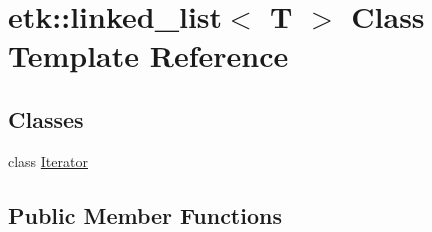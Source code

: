\hypertarget{classetk_1_1linked__list}{\section{etk\-:\-:linked\-\_\-list$<$ T $>$ Class Template Reference}
\label{classetk_1_1linked__list}
}
\subsection*{Classes}
\begin{DoxyCompactItemize}
\item 
class \hyperlink{classetk_1_1linked__list_1_1_iterator}{Iterator}
\end{DoxyCompactItemize}
\subsection*{Public Member Functions}
